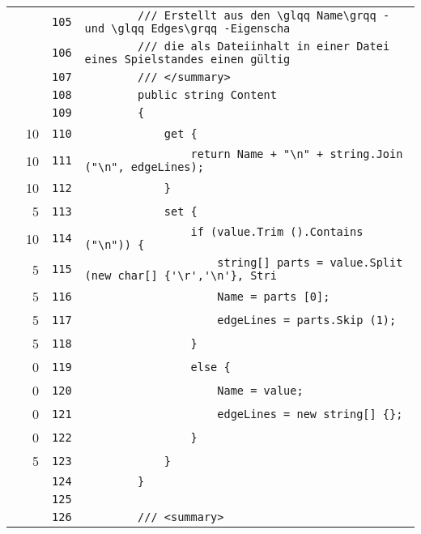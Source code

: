 \documentclass[a4paper,10pt]{article}
\begin{document}
\begin{longtable}[l]{lrrl}
\cellcolor{gray} &  & \verb~105~ & \verb~        /// Erstellt aus den \glqq Name\grqq - und \glqq Edges\grqq -Eigenscha~\\
\cellcolor{gray} &  & \verb~106~ & \verb~        /// die als Dateiinhalt in einer Datei eines Spielstandes einen gültig~\\
\cellcolor{gray} &  & \verb~107~ & \verb~        /// </summary>~\\
\cellcolor{gray} &  & \verb~108~ & \verb~        public string Content~\\
\cellcolor{gray} &  & \verb~109~ & \verb~        {~\\
\cellcolor{green} & 10 & \verb~110~ & \verb~            get {~\\
\cellcolor{green} & 10 & \verb~111~ & \verb~                return Name + "\n" + string.Join ("\n", edgeLines);~\\
\cellcolor{green} & 10 & \verb~112~ & \verb~            }~\\
\cellcolor{green} & 5 & \verb~113~ & \verb~            set {~\\
\cellcolor{green} & 10 & \verb~114~ & \verb~                if (value.Trim ().Contains ("\n")) {~\\
\cellcolor{green} & 5 & \verb~115~ & \verb~                    string[] parts = value.Split (new char[] {'\r','\n'}, Stri~\\
\cellcolor{green} & 5 & \verb~116~ & \verb~                    Name = parts [0];~\\
\cellcolor{green} & 5 & \verb~117~ & \verb~                    edgeLines = parts.Skip (1);~\\
\cellcolor{green} & 5 & \verb~118~ & \verb~                }~\\
\cellcolor{red} & 0 & \verb~119~ & \verb~                else {~\\
\cellcolor{red} & 0 & \verb~120~ & \verb~                    Name = value;~\\
\cellcolor{red} & 0 & \verb~121~ & \verb~                    edgeLines = new string[] {};~\\
\cellcolor{red} & 0 & \verb~122~ & \verb~                }~\\
\cellcolor{green} & 5 & \verb~123~ & \verb~            }~\\
\cellcolor{gray} &  & \verb~124~ & \verb~        }~\\
\cellcolor{gray} &  & \verb~125~ & \verb~~\\
\cellcolor{gray} &  & \verb~126~ & \verb~        /// <summary>~\\

\end{longtable}
\end{document}
